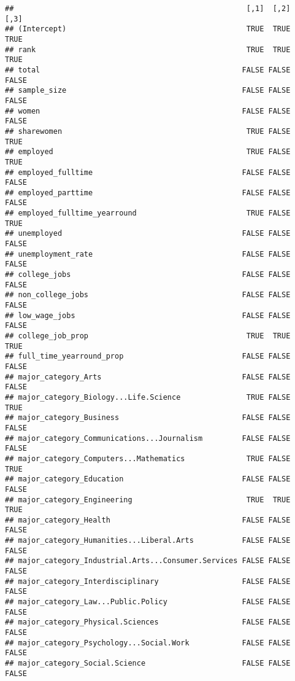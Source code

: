 \documentclass[
]{article}
\begin{document}
\begin{verbatim}
##                                                     [,1]  [,2]  [,3]
## (Intercept)                                         TRUE  TRUE  TRUE
## rank                                                TRUE  TRUE  TRUE
## total                                              FALSE FALSE FALSE
## sample_size                                        FALSE FALSE FALSE
## women                                              FALSE FALSE FALSE
## sharewomen                                          TRUE FALSE  TRUE
## employed                                            TRUE FALSE  TRUE
## employed_fulltime                                  FALSE FALSE FALSE
## employed_parttime                                  FALSE FALSE FALSE
## employed_fulltime_yearround                         TRUE FALSE  TRUE
## unemployed                                         FALSE FALSE FALSE
## unemployment_rate                                  FALSE FALSE FALSE
## college_jobs                                       FALSE FALSE FALSE
## non_college_jobs                                   FALSE FALSE FALSE
## low_wage_jobs                                      FALSE FALSE FALSE
## college_job_prop                                    TRUE  TRUE  TRUE
## full_time_yearround_prop                           FALSE FALSE FALSE
## major_category_Arts                                FALSE FALSE FALSE
## major_category_Biology...Life.Science               TRUE FALSE  TRUE
## major_category_Business                            FALSE FALSE FALSE
## major_category_Communications...Journalism         FALSE FALSE FALSE
## major_category_Computers...Mathematics              TRUE FALSE  TRUE
## major_category_Education                           FALSE FALSE FALSE
## major_category_Engineering                          TRUE  TRUE  TRUE
## major_category_Health                              FALSE FALSE FALSE
## major_category_Humanities...Liberal.Arts           FALSE FALSE FALSE
## major_category_Industrial.Arts...Consumer.Services FALSE FALSE FALSE
## major_category_Interdisciplinary                   FALSE FALSE FALSE
## major_category_Law...Public.Policy                 FALSE FALSE FALSE
## major_category_Physical.Sciences                   FALSE FALSE FALSE
## major_category_Psychology...Social.Work            FALSE FALSE FALSE
## major_category_Social.Science                      FALSE FALSE FALSE
\end{verbatim}
\end{document}

